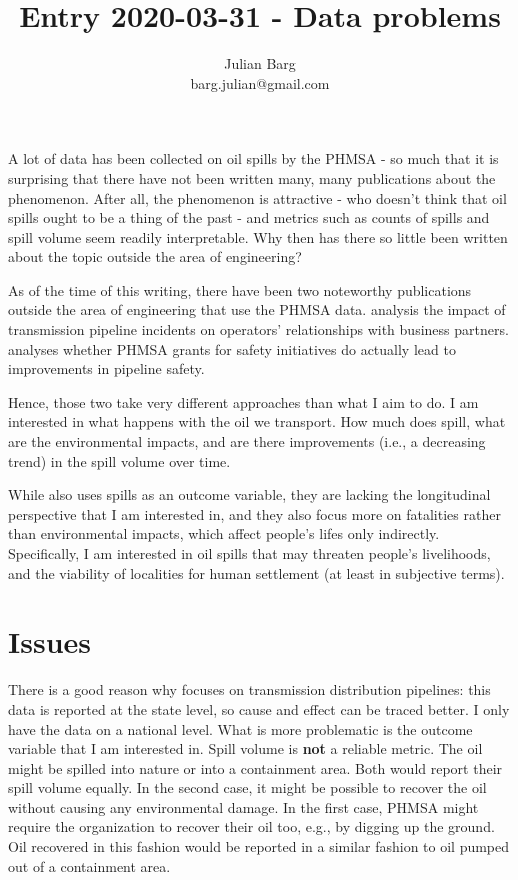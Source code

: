 \documentclass[12pt, man, natbib]{apa6}
\title{Entry 2020-03-31 - Data problems}
\author{Julian Barg\\barg.julian@gmail.com}
\affiliation{Ivey Business School}
\begin{document}
	
	\maketitle
	
	\singlespacing
	
	\section{}
	A lot of data has been collected on oil spills by the PHMSA - so much that it is surprising that there have not been written many, many publications about the phenomenon. After all, the phenomenon is attractive - who doesn't think that oil spills ought to be a thing of the past - and metrics such as counts of spills and spill volume seem readily interpretable. Why then has there so little been written about the topic outside the area of engineering?
	
	As of the time of this writing, there have been two noteworthy publications outside the area of engineering that use the PHMSA data. \citet{Park2019} analysis the impact of transmission pipeline incidents on operators' relationships with business partners. \citet{Scott2019} analyses whether PHMSA grants for safety initiatives do actually lead to improvements in pipeline safety.
	
	Hence, those two take very different approaches than what I aim to do. I am interested in what happens with the oil we transport. How much does spill, what are the environmental impacts, and are there improvements (i.e., a decreasing trend) in the spill volume over time.
	
	While \citet{Scott2019} also uses spills as an outcome variable, they are lacking the longitudinal perspective that I am interested in, and they also focus more on fatalities rather than environmental impacts, which affect people's lifes only indirectly. Specifically, I am interested in oil spills that may threaten people's livelihoods, and the viability of localities for human settlement (at least in subjective terms).
	
	\section{Issues}
	There is a good reason why \citet{Scott2019} focuses on transmission distribution pipelines: this data is reported at the state level, so cause and effect can be traced better. I only have the data on a national level. What is more problematic is the outcome variable that I am interested in. Spill volume is \textbf{not} a reliable metric. The oil might be spilled into nature or into a containment area. Both would report their spill volume equally. In the second case, it might be possible to recover the oil without causing any environmental damage. In the first case, PHMSA might require the organization to recover their oil too, e.g., by digging up the ground. Oil recovered in this fashion would be reported in a similar fashion to oil pumped out of a containment area.
	
\end{document}

